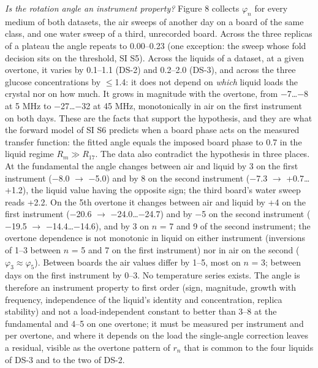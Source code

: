 \documentclass[11pt,a4paper]{article}
\begin{document}
\emph{Is the rotation angle an instrument property?} Figure 8 collects $\varphi_n$ for every medium of both datasets, the air sweeps of another day on a board of the same class, and one water sweep of a third, unrecorded board. Across the three replicas of a plateau the angle repeats to 0.00--0.23\textdegree{} (one exception: the sweep whose fold decision sits on the threshold, SI S5). Across the liquids of a dataset, at a given overtone, it varies by 0.1--1.1\textdegree{} (DS-2) and 0.2--2.0\textdegree{} (DS-3), and across the three glucose concentrations by $\le$1.4\textdegree{}: it does not depend on \emph{which} liquid loads the crystal nor on how much. It grows in magnitude with the overtone, from $-$7\ldots{}$-$8\textdegree{} at 5 MHz to $-$27\ldots{}$-$32\textdegree{} at 45 MHz, monotonically in air on the first instrument on both days. These are the facts that support the hypothesis, and they are what the forward model of SI S6 predicts when a board phase acts on the measured transfer function: the fitted angle equals the imposed board phase to 0.7\textdegree{} in the liquid regime $R_m \gg R_{17}$. The data also contradict the hypothesis in three places. At the fundamental the angle changes between air and liquid by 3\textdegree{} on the first instrument ($-$8.0\textdegree{} $\rightarrow$ $-$5.0\textdegree{}) and by 8\textdegree{} on the second instrument ($-$7.3\textdegree{} $\rightarrow$ +0.7\ldots{}+1.2\textdegree{}), the liquid value having the opposite sign; the third board's water sweep reads +2.2\textdegree{}. On the 5th overtone it changes between air and liquid by +4\textdegree{} on the first instrument ($-$20.6\textdegree{} $\rightarrow$ $-$24.0\ldots{}$-$24.7\textdegree{}) and by $-$5\textdegree{} on the second instrument ($-$19.5\textdegree{} $\rightarrow$ $-$14.4\ldots{}$-$14.6\textdegree{}), and by 3\textdegree{} on $n$ = 7 and 9 of the second instrument; the overtone dependence is not monotonic in liquid on either instrument (inversions of 1--3\textdegree{} between $n$ = 5 and 7 on the first instrument) nor in air on the second ($\varphi_3 \approx \varphi_5$). Between boards the air values differ by 1--5\textdegree{}, most on $n$ = 3; between days on the first instrument by 0--3\textdegree{}. No temperature series exists. The angle is therefore an instrument property to first order (sign, magnitude, growth with frequency, independence of the liquid's identity and concentration, replica stability) and not a load-independent constant to better than 3--8\textdegree{} at the fundamental and 4--5\textdegree{} on one overtone; it must be measured per instrument and per overtone, and where it depends on the load the single-angle correction leaves a residual, visible as the overtone pattern of $r_n$ that is common to the four liquids of DS-3 and to the two of DS-2.
\end{document}
